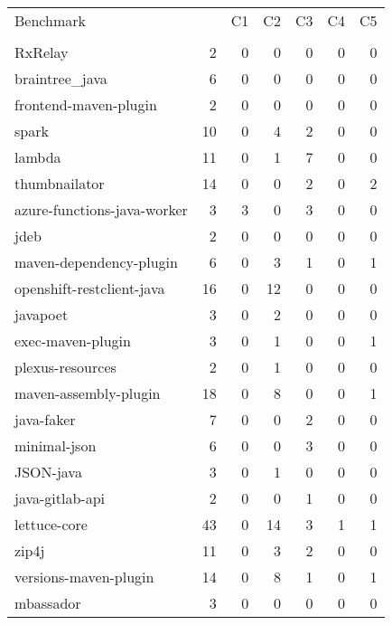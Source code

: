 \begin{table}[h]
    \begin{tabular}{lrrrrrr}
        Benchmark                   &  & C1 & C2 & C3 & C4 & C5 \\ 
         & & & & & & \\ \hline
        RxRelay                     & 2                 & 0  & 0  & 0  & 0  & 0  \\
        braintree\_java             & 6                 & 0  & 0  & 0  & 0  & 0  \\
        frontend-maven-plugin       & 2                 & 0  & 0  & 0  & 0  & 0  \\
        spark                       & 10                & 0  & 4  & 2  & 0  & 0  \\
        lambda                      & 11                & 0  & 1  & 7  & 0  & 0  \\
        thumbnailator               & 14                & 0  & 0  & 2  & 0  & 2  \\
        azure-functions-java-worker & 3                 & 3  & 0  & 3  & 0  & 0  \\
        jdeb                        & 2                 & 0  & 0  & 0  & 0  & 0  \\
        maven-dependency-plugin     & 6                 & 0  & 3  & 1  & 0  & 1  \\
        openshift-restclient-java   & 16                & 0  & 12 & 0  & 0  & 0  \\
        javapoet                    & 3                 & 0  & 2  & 0  & 0  & 0  \\
        exec-maven-plugin           & 3                 & 0  & 1  & 0  & 0  & 1  \\
        plexus-resources            & 2                 & 0  & 1  & 0  & 0  & 0  \\
        maven-assembly-plugin       & 18                & 0  & 8  & 0  & 0  & 1  \\
        java-faker                  & 7                 & 0  & 0  & 2  & 0  & 0  \\
        minimal-json                & 6                 & 0  & 0  & 3  & 0  & 0  \\
        JSON-java                   & 3                 & 0  & 1  & 0  & 0  & 0  \\
        java-gitlab-api             & 2                 & 0  & 0  & 1  & 0  & 0  \\
        lettuce-core                & 43                & 0  & 14 & 3  & 1  & 1  \\
        zip4j                       & 11                & 0  & 3  & 2  & 0  & 0  \\
        versions-maven-plugin       & 14                & 0  & 8  & 1  & 0  & 1  \\
        mbassador                   & 3                 & 0  & 0  & 0  & 0  & 0
    \end{tabular}
\end{table}